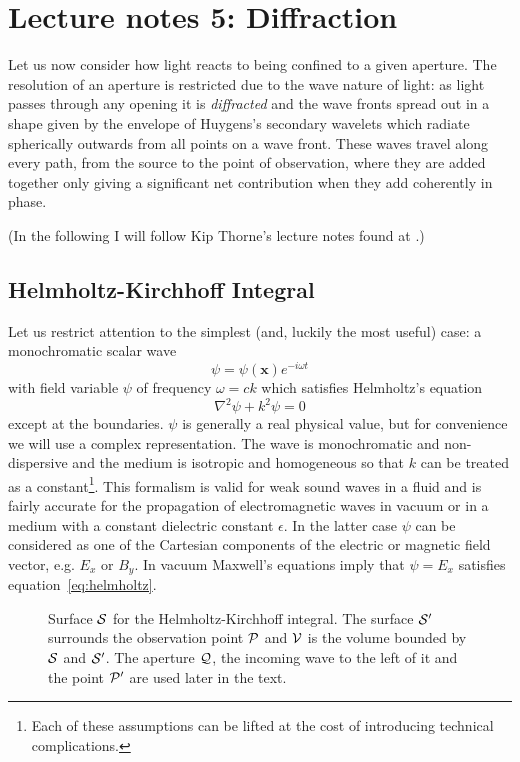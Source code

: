 \documentclass{article}
\newcommand{\be}{\begin{equation}}
\newcommand{\ee}{\end{equation}}
\begin{document}
\section*{Lecture notes 5: Diffraction}

Let us now consider how light reacts to being confined to a given aperture. The resolution 
of an aperture is restricted due to the wave nature of light: as light passes through any 
opening it is {\it diffracted} and the wave fronts spread out in a shape given by the 
envelope of Huygens's secondary wavelets which radiate spherically outwards from all points on 
a wave front. These waves travel along every path, from the source to the point of observation,
where they are added together only giving a significant net contribution when they add 
coherently in phase. 

\noindent (In the following I will follow Kip Thorne's lecture notes found at 
.)

\subsection*{Helmholtz-Kirchhoff Integral}

Let us restrict attention to the simplest (and, luckily the most
useful) case: a monochromatic scalar wave 
\[
\psi=\psi({\mathbf x})e^{-i\omega t}
\]
with field variable $\psi$ of frequency $\omega=ck$ which satisfies Helmholtz's equation
\be
\nabla^2\psi+k^2\psi=0
\label{eq:helmholtz}
\ee
except at the boundaries. $\psi$ is generally a real physical value, but for convenience we will
use a complex representation. The wave is monochromatic and non-dispersive and the medium is
isotropic and homogeneous so that $k$ can be treated as a constant\footnote{Each of these 
assumptions can be lifted at the cost of introducing technical complications.}. This formalism
is valid for weak sound waves in a fluid and is fairly accurate for the propagation of 
electromagnetic waves in vacuum or in a medium with a constant dielectric constant $\epsilon$. 
In the latter case $\psi$ can be considered as one of the Cartesian components of the electric
or magnetic field vector, e.g. $E_x$ or $B_y$. In vacuum Maxwell's equations imply that 
$\psi=E_x$ satisfies equation~\ref{eq:helmholtz}. 

\begin{figure}[th!]
  \hfil{}\hfil
  \caption{Surface $\cal{S}$ for the Helmholtz-Kirchhoff integral. The surface
$\cal{S'}$ surrounds the observation point $\cal{P}$ and $\cal{V}$ is the 
volume bounded by $\cal{S}$ and $\cal{S'}$. The aperture $\cal{Q}$, the 
incoming wave to the left of it and the point $\cal{P'}$ are used later in the
text.}
  \label{fig:helmholz-kirchhoff-surface}
\end{figure}
\end{document}
